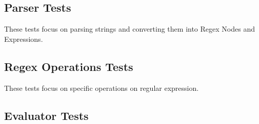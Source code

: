 \documentclass[letterpaper, 11pt]{article}
\begin{document}
\subsection{Parser Tests}\label{test:parser}
These tests focus on parsing strings and converting them into Regex Nodes and Expressions. 

\subsection{Regex Operations Tests}\label{test:regex}
These tests focus on specific operations on regular expression.

\subsection{Evaluator Tests}\label{test:eval}


\end{document}
